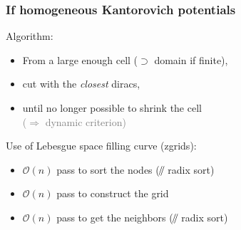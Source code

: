 \documentclass[aspectratio=169]{beamer}
\newcommand{\parallelsum}{\mathbin{\!/\mkern-5mu/\!}}
\begin{document}
\begin{frame}
    \frametitle{If homogeneous Kantorovich potentials}

    \begin{minipage}[c][0.6\textheight][c]{0.6\textwidth}
        Algorithm:
        \begin{itemize}
            \item From a large enough cell ($\supset$ domain if finite),
            \item cut with the \textit{closest} diracs,
            \item until no longer possible to shrink the cell \\ \hfill \textcolor{gray}{($\Rightarrow$ dynamic criterion)}
        \end{itemize}

        \vfill
        Use of Lebesgue space filling curve (zgrids):
        \begin{itemize}
            \item $\mathcal{O}( n )$ pass to sort the nodes ($\parallelsum$ radix sort)
            \item $\mathcal{O}( n )$ pass to construct the grid
            \item $\mathcal{O}( n )$ pass to get the neighbors ($\parallelsum$ radix sort)
        \end{itemize}
    \end{minipage}
    \textwidth
    \begin{minipage}{0.35\textwidth}
        \begin{center}
            
        \end{center}
    \end{minipage}
\end{frame}
\end{document}
